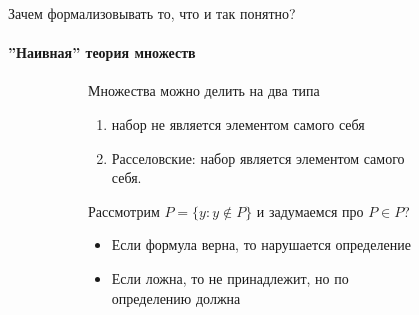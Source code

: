  \begin{frame}{Зачем формализовывать то, что и так понятно?}
 	\framesubtitle{''Наивная'' теория множеств}
 	\begin{figure}[t]
 		\begin{subfigure}[t]{0.55\textwidth}
 			\vspace{-7em}
 			Множества можно делить на два типа
 			\begin{enumerate}
 				\item   набор не является элементом самого себя
 				\item Расселовские: набор является элементом самого себя.
 			\end{enumerate}
 			Рассмотрим $P=\{y: y\notin P\}$ и задумаемся про $P\in P$?
 			\begin{itemize}
 				\item Если формула верна, то нарушается определение
 				\item Если ложна, то не принадлежит, но по определению должна
 			\end{itemize}


\end{subfigure}
\end{figure}
\end{frame}
